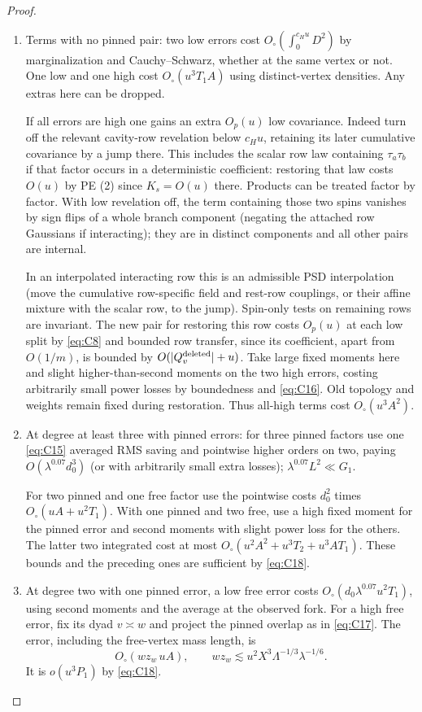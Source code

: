 \begin{proof}
\begin{enumerate}[label=(\roman*)]

\item Terms with no pinned pair: two low errors cost \(O_\circ(\int_0^{c_Hu}D^2)\) by marginalization and Cauchy--Schwarz, whether at the same vertex or not. One low and one high cost \(O_\circ(u^3 T_1 A)\) using distinct-vertex densities. Any extras here can be dropped.

If all errors are high one gains an extra \(O_p(u)\) low covariance. Indeed turn off the relevant cavity-row revelation below \(c_Hu\), retaining its later cumulative covariance by a jump there. This includes the scalar row law containing \(\tau_a\tau_b\) if that factor occurs in a deterministic coefficient: restoring that law costs \(O(u)\) by PE (2) since \(K_s=O(u)\) there. Products can be treated factor by factor. With low revelation off, the term containing those two spins vanishes by sign flips of a whole branch component (negating the attached row Gaussians if interacting); they are in distinct components and all other pairs are internal.

In an interpolated interacting row this is an admissible PSD interpolation (move the cumulative row-specific field and rest-row couplings, or their affine mixture with the scalar row, to the jump). Spin-only tests on remaining rows are invariant. The new pair for restoring this row costs \(O_p(u)\) at each low split by \eqref{eq:C8} and bounded row transfer, since its coefficient, apart from \(O(1/m)\), is bounded by \(O(|Q_v^{\rm deleted}|+u)\). Take large fixed moments here and slight higher-than-second moments on the two high errors, costing arbitrarily small power losses by boundedness and \eqref{eq:C16}. Old topology and weights remain fixed during restoration. Thus all-high terms cost \(O_\circ(u^3 A^2)\).
\item At degree at least three with pinned errors: for three pinned factors use one \eqref{eq:C15} averaged RMS saving and pointwise higher orders on two, paying \(O(\lambda^{0.07}d_0^3)\) (or with arbitrarily small extra losses); \(\lambda^{0.07} L^2\ll G_1\).

For two pinned and one free factor use the pointwise costs \(d_0^2\) times \(O_\circ(u A+u^2 T_1)\). With one pinned and two free, use a high fixed moment for the pinned error and second moments with slight power loss for the others. The latter two integrated cost at most \(O_\circ(u^2 A^2+u^3 T_2+u^3 A T_1)\). These bounds and the preceding ones are sufficient by \eqref{eq:C18}.
\item At degree two with one pinned error, a low free error costs
\(O_\circ(d_0\lambda^{0.07}u^2T_1)\), using second moments and the
average at the observed fork. For a high free error, fix its dyad
\(v\asymp w\) and project the pinned overlap as in
\eqref{eq:C17}. The error, including the free-vertex mass length, is
\[
 O_\circ(wz_w\,uA),\qquad
 wz_w\lesssim u^2X^3\Lambda^{-1/3}\lambda^{-1/6}.
\]
It is \(o(u^3P_1)\) by \eqref{eq:C18}.


\end{enumerate}
\end{proof}
